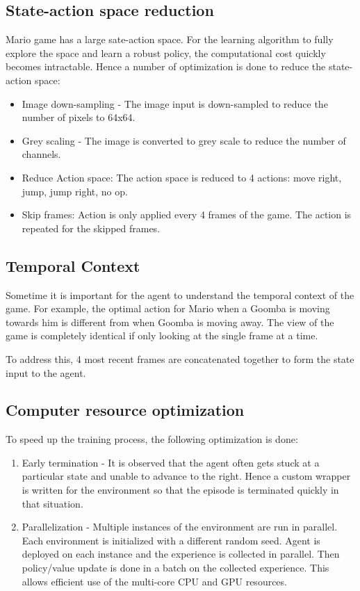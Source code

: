 \documentclass[conference]{IEEEtran}
\begin{document}
\subsection{State-action space reduction}

Mario game has a large sate-action space. For the learning algorithm to fully explore the space and learn a robust policy, the computational cost quickly becomes intractable. Hence a number of optimization is done to reduce the state-action space:

\begin{itemize}
    \item Image down-sampling - The image input is down-sampled to reduce the number of pixels to 64x64.
    \item Grey scaling - The image is converted to grey scale to reduce the number of channels.
    \item Reduce Action space: The action space is reduced to 4 actions: move right, jump, jump right, no op.
    \item Skip frames: Action is only applied every 4 frames of the game. The action is repeated for the skipped frames.
\end{itemize}

\subsection{Temporal Context}

Sometime it is important for the agent to understand the temporal context of the game. For example, the optimal action for Mario when a Goomba is moving towards him is different from when Goomba is moving away. The view of the game is completely identical if only looking at the single frame at a time.

To address this, 4 most recent frames are concatenated together to form the state input to the agent.

\subsection{Computer resource optimization}

To speed up the training process, the following optimization is done:
\begin{enumerate}
    \item Early termination - It is observed that the agent often gets stuck at a particular state and unable to advance to the right. Hence a custom wrapper is written for the environment so that the episode is terminated quickly in that situation.
    \item Parallelization - Multiple instances of the environment are run in parallel. Each environment is initialized with a different random seed. Agent is deployed on each instance and the experience is collected in parallel. Then policy/value update is done in a batch on the collected experience. This allows efficient use of the multi-core CPU and GPU resources.
\end{enumerate}
\end{document}
